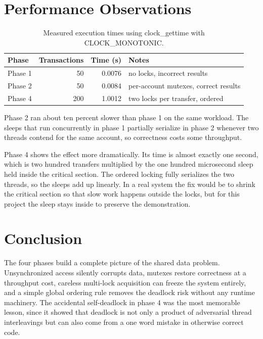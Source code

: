 \documentclass[11pt]{article}
\begin{document}
\section{Performance Observations}

\begin{table}[H]
    \centering
    \begin{tabular}{lrrl}
        \toprule
        Phase & Transactions & Time (s) & Notes \\
        \midrule
        Phase 1 & 50 & 0.0076 & no locks, incorrect results \\
        Phase 2 & 50 & 0.0084 & per-account mutexes, correct results \\
        Phase 4 & 200 & 1.0012 & two locks per transfer, ordered \\
        \bottomrule
    \end{tabular}
    \caption{Measured execution times using clock\_gettime with CLOCK\_MONOTONIC.}
\end{table}

Phase 2 ran about ten percent slower than phase 1 on the same workload. The sleeps that run concurrently in phase 1 partially serialize in phase 2 whenever two threads contend for the same account, so correctness costs some throughput.

Phase 4 shows the effect more dramatically. Its time is almost exactly one second, which is two hundred transfers multiplied by the one hundred microsecond sleep held inside the critical section. The ordered locking fully serializes the two threads, so the sleeps add up linearly. In a real system the fix would be to shrink the critical section so that slow work happens outside the locks, but for this project the sleep stays inside to preserve the demonstration.

\section{Conclusion}

The four phases build a complete picture of the shared data problem. Unsynchronized access silently corrupts data, mutexes restore correctness at a throughput cost, careless multi-lock acquisition can freeze the system entirely, and a simple global ordering rule removes the deadlock risk without any runtime machinery. The accidental self-deadlock in phase 4 was the most memorable lesson, since it showed that deadlock is not only a product of adversarial thread interleavings but can also come from a one word mistake in otherwise correct code.
\end{document}
